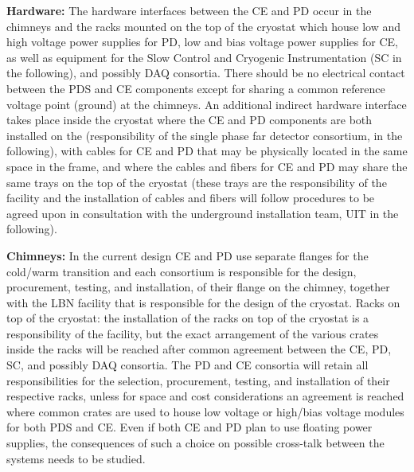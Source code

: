 \hspace{0.5cm}\textbf{Hardware: }The hardware interfaces between the CE and PD occur in the chimneys and the racks mounted on the top of the cryostat which house low and high voltage power supplies for PD, low and bias voltage power supplies for CE, as well as equipment for the Slow Control and Cryogenic Instrumentation (SC in the following), and possibly DAQ consortia. There should be no electrical contact between the PDS and CE components except for sharing a common reference voltage point (ground) at the chimneys. An additional indirect hardware interface takes place inside the cryostat where the CE and PD components are both installed on the  (responsibility of the single phase far detector  consortium,  in the following), with cables for CE and PD that may be physically located in the same space in the  frame, and where the cables and fibers for CE and PD may share the same trays on the top of the cryostat (these trays are the responsibility of the facility and the installation of cables and fibers will follow procedures to be agreed upon in consultation with the underground installation team, UIT in the following).

\textbf{Chimneys: }In the current design CE and PD use separate flanges for the cold/warm transition and each consortium is responsible for the design, procurement, testing, and installation, of their flange on the chimney, together with the LBN facility that is responsible for the design of the cryostat.
Racks on top of the cryostat: the installation of the racks on top of the cryostat is a responsibility of the facility, but the exact arrangement of the various crates inside the racks will be reached after common agreement between the CE, PD, SC, and possibly DAQ consortia. The PD and CE consortia will retain all responsibilities for the selection, procurement, testing, and installation of their respective racks, unless for space and cost considerations an agreement is reached where common crates are used to house low voltage or high/bias voltage modules for both PDS and CE. Even if both CE and PD plan to use floating power supplies, the consequences of such a choice on possible cross-talk between the systems needs to be studied. 

